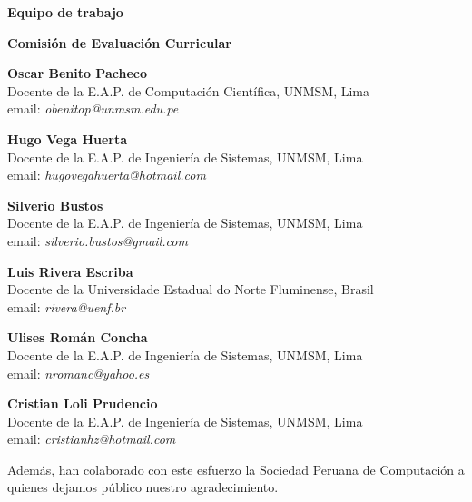 \begin{center}
{\bf \Huge Equipo de trabajo}
\end{center}
\vspace{1cm}

\begin{center}
\textbf{Comisión de Evaluación Curricular}\\
\end{center}

\begin{center}
\textbf{Oscar Benito Pacheco}\\
Docente de la E.A.P. de Computación Cientí­fica, UNMSM, Lima\\ 
email: \textit{obenitop@unmsm.edu.pe}\\
\end{center}

\begin{center}
\textbf{Hugo Vega Huerta}\\
Docente de la E.A.P. de Ingenierí­a de Sistemas, UNMSM, Lima\\ 
email: \textit{hugovegahuerta@hotmail.com}\\
\end{center}

\begin{center}
\textbf{Silverio Bustos}\\
Docente de la E.A.P. de Ingenierí­a de Sistemas, UNMSM, Lima\\ 
email: \textit{silverio.bustos@gmail.com}\\
\end{center}

\begin{center}
\textbf{Luis Rivera Escriba}\\
Docente de la Universidade Estadual do Norte Fluminense, Brasil\\ 
email: \textit{rivera@uenf.br}\\
\end{center}

\begin{center}
\textbf{Ulises Román Concha}\\
Docente de la E.A.P. de Ingenierí­a de Sistemas, UNMSM, Lima\\ 
email: \textit{nromanc@yahoo.es}\\
\end{center}

\begin{center}
\textbf{Cristian Loli Prudencio}\\
Docente de la E.A.P. de Ingenierí­a de Sistemas, UNMSM, Lima\\ 
email: \textit{cristianhz@hotmail.com}\\
\end{center}

Además, han colaborado con este esfuerzo la Sociedad Peruana de Computación a quienes dejamos público nuestro agradecimiento.
